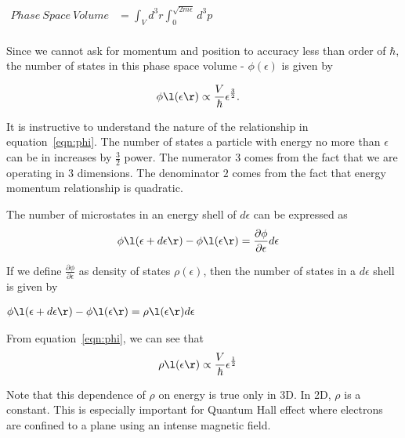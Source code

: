 \documentclass[12pt]{article}
\begin{document}
$\begin{aligned}
Phase\ Space\ Volume & = \int_{V}d^3r\int_{0}^{\sqrt{2m\epsilon}}d^3p \\
 \end{aligned}$

Since we cannot ask for momentum and position to accuracy less than order of 
$\hbar$, the number of states in this phase space volume - $\phi(\epsilon)$ is
given by

\begin{equation}\label{eqn:phi}
\begin{split}
\phi \l( \epsilon \r) & \propto \frac{V}{\hbar} \epsilon^\frac{3}{2}.
\end{split}
\end{equation}

It is instructive to understand the nature of the relationship in 
equation~\ref{eqn:phi}. The number of states a particle with energy no more than
$\epsilon$ can be in increases by $\frac{3}{2}$ power. The numerator $3$ comes 
from the fact that we are operating in $3$ dimensions. The denominator $2$ comes
from the fact that energy momentum relationship is quadratic.

The number of microstates in an energy shell of $d\epsilon$ can be expressed as
\begin{equation*}
\begin{split}
\phi \l( \epsilon + d\epsilon \r) -\phi\l(\epsilon\r) & = 
\frac{\partial \phi}{\partial \epsilon}d\epsilon
\end{split}
\end{equation*}

If we define $\frac{\partial \phi}{\partial \epsilon}$ as density of states
$\rho(\epsilon)$, then the number of states in a $d\epsilon$ shell is given by

$\begin{aligned}
\phi \l( \epsilon + d\epsilon \r) - \phi\l(\epsilon\r) & = 
\rho \l( \epsilon \r)d\epsilon \\
 \end{aligned}$

From equation~\ref{eqn:phi}, we can see that
\begin{equation}
\begin{split}
\rho \l( \epsilon \r) & \propto \frac{V}{\hbar}\epsilon^\frac{1}{2}
\end{split}
\end{equation}

Note that this dependence of $\rho$ on energy is true only in 3D. In 2D, $\rho$
is a constant. This is especially important for Quantum Hall effect where 
electrons are confined to a plane using an intense magnetic field. 
\end{document}
